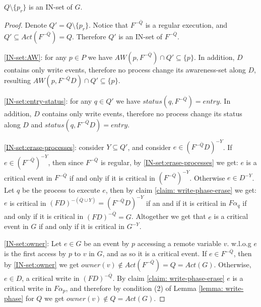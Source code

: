 \begin{claim-subsection}
	$Q \setminus \{p_r\}$ is an IN-set of $G$.
\end{claim-subsection}

\begin{proof}
	Denote $Q' = Q \setminus \{p_r\}$. Notice that $F^{-\overline{Q}}$ is a regular execution, and $Q' \subseteq Act(F^{-\overline{Q}}) = Q$. Therefore $Q'$ is an IN-set of $F^{-\overline{Q}}$.
	
	\ref{IN-set:AW}: for any $p \in P$ we have $AW(p,F^{-\overline{Q}}) \cap Q' \subseteq \{p\}$. In addition, $D$ contains only write events, therefore no process change its awareness-set along $D$, resulting $AW(p,F^{-\overline{Q}} D) \cap Q' \subseteq \{p\}$.
	
	\ref{IN-set:entry-status}: for any $q \in Q'$ we have $status(q,F^{-\overline{Q}}) = entry$.  In addition, $D$ contains only write events, therefore no process change its status along $D$ and $status(q,F^{-\overline{Q}} D) = entry$.
	
	\ref{IN-set:erase-processes}: consider $Y \subseteq Q'$, and consider $e \in (F^{-\overline{Q}} D)^{-Y}$. If $e \in (F^{-\overline{Q}})^{-Y}$, then since $F^{-\overline{Q}}$ is regular, by \ref{IN-set:erase-processes} we get: $e$ is a critical event in $F^{-\overline{Q}}$ if and only if it is critical in $(F^{-\overline{Q}})^{-Y}$. Otherwise $e \in D^{-Y}$. Let $q$ be the process to execute $e$, then by claim \ref{claim: write-phase-erase} we get: $e$ is critical in $(F D)^{-(\overline{Q} \cup Y)} = (F^{-\overline{Q}} D)^{-Y}$ if an and if it is critical in $F \alpha_q$ if and only if it is critical in $(F D)^{-\overline{Q}} = G$.
	Altogether we get that $e$ is a critical event in $G$ if and only if it is critical in $G^{-Y}$.
	
	\ref{IN-set:owner}: Let $e \in G$ be an event by $p$ accessing a remote variable $v$. w.l.o.g $e$ is the first access by $p$ to $v$ in $G$, and as so it is a critical event. If $e \in F^{-\overline{Q}}$, then by \ref{IN-set:owner} we get $owner(v) \notin Act(F^{-\overline{Q}}) = Q =Act(G)$. Otherwise, $e \in D$, a critical write in $(F D)^{-\overline{Q}}$. By claim \ref{claim: write-phase-erase} $e$ is a critical write in $F \alpha_p$, and therefore by condition (2) of Lemma \ref{lemma: write-phase} for $Q$ we get $owner(v) \notin Q = Act(G)$.
	

\end{proof}
